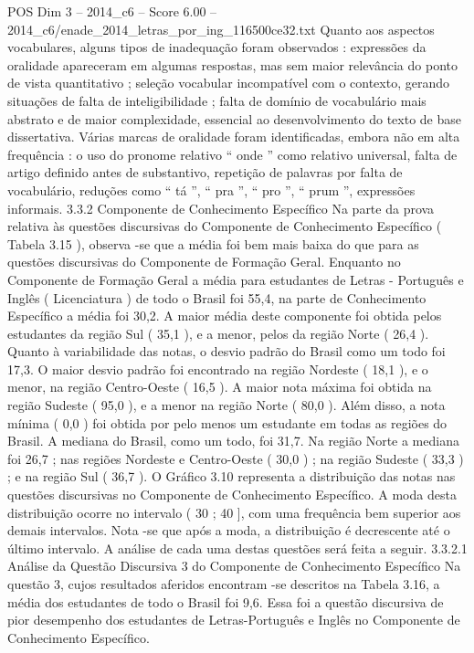 \begin{textsample}{POS Dim 3 – 2014\_c6 – Score 6.00 – 2014\_c6/enade\_2014\_letras\_por\_ing\_116500ce32.txt}
Quanto aos aspectos vocabulares, alguns tipos de inadequação foram observados : expressões da oralidade apareceram em algumas respostas, mas sem maior relevância do ponto de vista quantitativo ; seleção vocabular incompatível com o contexto, gerando situações de falta de inteligibilidade ; falta de domínio de vocabulário mais abstrato e de maior complexidade, essencial ao desenvolvimento do texto de base dissertativa.
Várias marcas de oralidade foram identificadas, embora não em alta frequência : o uso do pronome relativo “ onde ” como relativo universal, falta de artigo definido antes de substantivo, repetição de palavras por falta de vocabulário, reduções como “ tá ”, “ pra ”, “ pro ”, “ prum ”, expressões informais. 3.3.2 Componente de Conhecimento Específico Na parte da prova relativa às questões discursivas do Componente de Conhecimento Específico ( Tabela 3.15 ), observa -se que a média foi bem mais baixa do que para as questões discursivas do Componente de Formação Geral.
Enquanto no Componente de Formação Geral a média para estudantes de Letras - Português e Inglês ( Licenciatura ) de todo o Brasil foi 55,4, na parte de Conhecimento Específico a média foi 30,2.
A maior média deste componente foi obtida pelos estudantes da região Sul ( 35,1 ), e a menor, pelos da região Norte ( 26,4 ).
Quanto à variabilidade das notas, o desvio padrão do Brasil como um todo foi 17,3.
O maior desvio padrão foi encontrado na região Nordeste ( 18,1 ), e o menor, na região Centro-Oeste ( 16,5 ).
A maior nota máxima foi obtida na região Sudeste ( 95,0 ), e a menor na região Norte ( 80,0 ).
Além disso, a nota mínima ( 0,0 ) foi obtida por pelo menos um estudante em todas as regiões do Brasil.
A mediana do Brasil, como um todo, foi 31,7.
Na região Norte a mediana foi 26,7 ; nas regiões Nordeste e Centro-Oeste ( 30,0 ) ; na região Sudeste ( 33,3 ) ; e na região Sul ( 36,7 ).
O Gráfico 3.10 representa a distribuição das notas nas questões discursivas no Componente de Conhecimento Específico.
A moda desta distribuição ocorre no intervalo ( 30 ; 40 ], com uma frequência bem superior aos demais intervalos.
Nota -se que após a moda, a distribuição é decrescente até o último intervalo.
A análise de cada uma destas questões será feita a seguir. 3.3.2.1 Análise da Questão Discursiva 3 do Componente de Conhecimento Específico Na questão 3, cujos resultados aferidos encontram -se descritos na Tabela 3.16, a média dos estudantes de todo o Brasil foi 9,6.
Essa foi a questão discursiva de pior desempenho dos estudantes de Letras-Português e Inglês no Componente de Conhecimento Específico.

\end{textsample}
